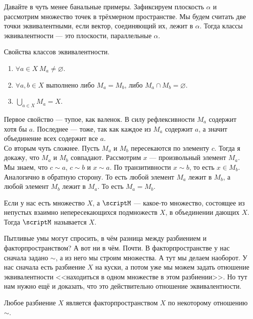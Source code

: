\documentclass{article}
\begin{document}
\begin{itemize}
\begin{Example}
        \end{Example}
        \begin{Example}
            Давайте в чуть менее банальные примеры. Зафиксируем плоскость $\alpha$ и рассмотрим множество точек в трёхмерном пространстве. Мы будем считать две точки эквивалентными, если вектор, соединяющий их, лежит в $\alpha$. Тогда классы эквивалентности --- это плоскости, параллельные $\alpha$.
        \end{Example}
        \thm Свойства классов эквивалентности.
        \begin{enumerate}
            \item $\forall a\in X~M_a\neq\varnothing$.
            \item $\forall a,b\in X$ выполнено либо $M_a=M_b$, либо $M_a\cap M_b=\varnothing$.
            \item $\bigcup\limits_{a\in X}M_a=X$.
        \end{enumerate}
        \begin{Proof}
            Первое свойство --- тупое, как валенок. В силу рефлексивности $M_a$ содержит хотя бы $a$. Последнее --- тоже, так как каждое из $M_a$ содержит $a$, а значит объединение всех содержит все $a$.\\
            Со вторым чуть сложнее. Пусть $M_a$ и $M_b$ пересекаются по элементу $c$. Тогда я докажу, что $M_a$ и $M_b$ совпадают. Рассмотрим $x$ --- произвольный элемент $M_a$. Мы знаем, что $c\sim a$, $c\sim b$ и $x\sim a$. По транзитивности $x\sim b$, то есть $x\in M_b$. Аналогично в обратную сторону. То есть любой элемент $M_a$ лежит в $M_b$, а любой элемент $M_b$ лежит в $M_a$. То есть $M_a=M_b$.
        \end{Proof}
        \dfn Если у нас есть множество $X$, а $\scriptM$ --- какое-то множество, состоящее из непустых взаимно непересекающихся подмножеств $X$, в объединении дающих $X$. Тогда $\scriptM$ называется  $X$.
        \begin{Comment}
            Пытливые умы могут спросить, в чём разница между разбиением и факторпространством? А вот ни в чём. Почти. В факторпространстве у нас сначала задано $\sim$, а из него мы строим множества. А тут мы делаем наоборот. У нас сначала есть разбиение $X$ на куски, а потом уже мы можем задать отношение эквивалентности <<находиться в одном множестве в этом разбиении>>. Но тут нам нужно ещё и доказать, что это действительно отношение эквивалентности.
        \end{Comment}
        \thm Любое разбиение $X$ является факторпространством $X$ по некоторому отношению $\sim$.

\end{itemize}
\end{document}

